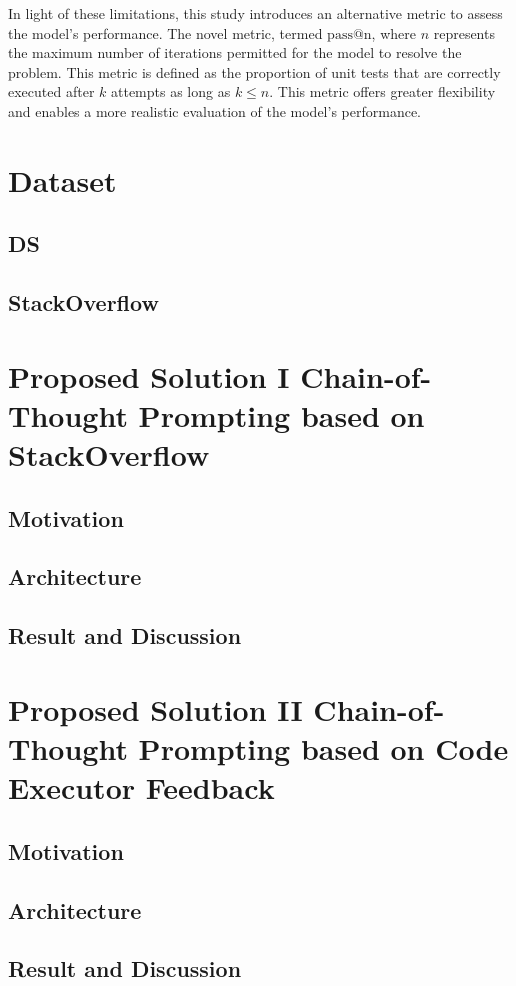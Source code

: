 \documentclass[a4paper,oneside]{book}
\begin{document}
In light of these limitations, this study introduces an alternative metric to assess the model's performance. The novel metric, termed $\text{pass@n}$, where $n$ represents the maximum number of iterations permitted for the model to resolve the problem. This metric is defined as the proportion of unit tests that are correctly executed after $k$ attempts as long as $k \leq n$. This metric offers greater flexibility and enables a more realistic evaluation of the model's performance.

\section{Dataset}
\subsection{DS}
\subsection{StackOverflow}
\section{Proposed Solution I\: Chain-of-Thought Prompting based on StackOverflow}
\subsection{Motivation}
\subsection{Architecture}
\subsection{Result and Discussion}
\section{Proposed Solution II\: Chain-of-Thought Prompting based on Code Executor Feedback}
\subsection{Motivation}
\subsection{Architecture}
\subsection{Result and Discussion}
\end{document}
